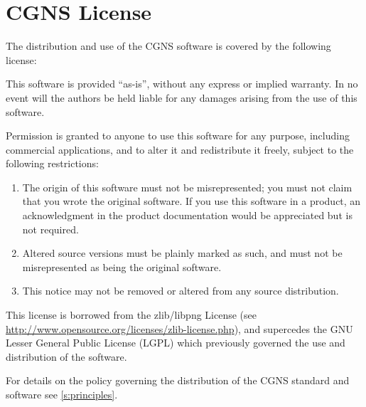 \section{CGNS License}
\label{s:license}
\thispagestyle{plain}

The distribution and use of the CGNS software is covered by the
following license:

\begin{indleft}
This software is provided ``as-is'', without any express or implied
warranty.
In no event will the authors be held liable for any damages arising from
the use of this software.

Permission is granted to anyone to use this software for any purpose,
including commercial applications, and to alter it and redistribute it
freely, subject to the following restrictions:
\begin{enumerate}
\item The origin of this software must not be misrepresented; you must
      not claim that you wrote the original software.
      If you use this software in a product, an acknowledgment in the
      product documentation would be appreciated but is not required.
\item Altered source versions must be plainly marked as such, and must
      not be misrepresented as being the original software.
\item This notice may not be removed or altered from any source
      distribution.
\end{enumerate}
\end{indleft}

This license is borrowed from the zlib/libpng License (see
\url{http://www.opensource.org/licenses/zlib-license.php}), and
supercedes the GNU Lesser General Public License (LGPL) which previously
governed the use and distribution of the software.

For details on the policy governing the distribution of the CGNS
standard and software see \autoref{s:principles}.
